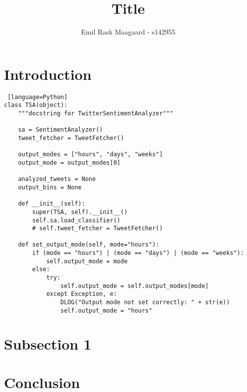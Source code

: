 \documentclass{dtu_report_short}
\title{Title}
\author{Emil Rask Maagaard - s142955}
\begin{document}
\maketitle{}
\titlepage


\section*{Introduction}



\begin{lstlisting} [language=Python]
class TSA(object):
    """docstring for TwitterSentimentAnalyzer"""

    sa = SentimentAnalyzer()
    tweet_fetcher = TweetFetcher()

    output_modes = ["hours", "days", "weeks"]
    output_mode = output_modes[0]

    analyzed_tweets = None
    output_bins = None

    def __init__(self):
        super(TSA, self).__init__()
        self.sa.load_classifier()
        # self.tweet_fetcher = TweetFetcher()

    def set_output_mode(self, mode="hours"):
        if (mode == "hours") | (mode == "days") | (mode == "weeks"):
            self.output_mode = mode
        else:
            try:
                self.output_mode = self.output_modes[mode]
            except Exception, e:
                DLOG("Output mode not set correctly: " + str(e))
                self.output_mode = "hours"

\end{lstlisting}


\newpage
\section*{Subsection 1}



\newpage
\section*{Conclusion}

\end{document}
